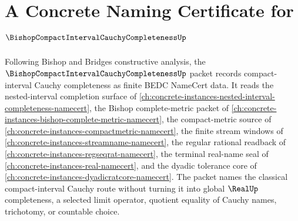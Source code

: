 \chapter{A Concrete Naming Certificate for $\BishopCompactIntervalCauchyCompletenessUp$}
\label{ch:concrete-instances-bishop-compact-interval-cauchy-completeness-namecert}

Following Bishop and Bridges constructive analysis, the $\BishopCompactIntervalCauchyCompletenessUp$ packet records compact-interval Cauchy completeness as finite BEDC NameCert data. It reads the nested-interval completion surface of \autoref{ch:concrete-instances-nested-interval-completeness-namecert}, the Bishop complete-metric packet of \autoref{ch:concrete-instances-bishop-complete-metric-namecert}, the compact-metric source of \autoref{ch:concrete-instances-compactmetric-namecert}, the finite stream windows of \autoref{ch:concrete-instances-streamname-namecert}, the regular rational readback of \autoref{ch:concrete-instances-regseqrat-namecert}, the terminal real-name seal of \autoref{ch:concrete-instances-real-namecert}, and the dyadic tolerance core of \autoref{ch:concrete-instances-dyadicratcore-namecert}. The packet names the classical compact-interval Cauchy route without turning it into global $\RealUp$ completeness, a selected limit operator, quotient equality of Cauchy names, trichotomy, or countable choice.

